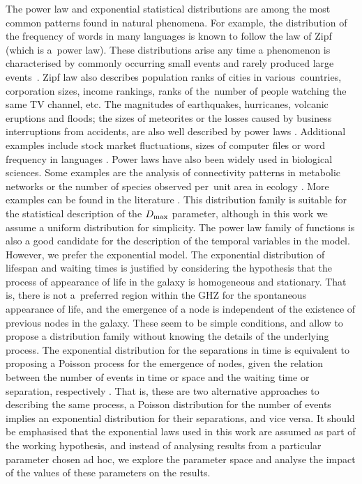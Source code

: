 \documentclass[crop]{CSLB}
\begin{document}
The power law and exponential statistical distributions are among the
most common patterns found in natural phenomena.
%
For example, the distribution of the frequency of words in many
languages is known to follow the law of Zipf (which is a power law).
%
These distributions arise any time a phenomenon is characterised by
commonly occurring small events and rarely produced large
events \citep[e.g.  ][]{adamic_zipf_2000}.
%
Zipf law also describes population ranks of cities in
various countries, corporation sizes, income rankings, ranks of
the number of people watching the same TV channel, etc.
%
The magnitudes of earthquakes, hurricanes, volcanic eruptions and
floods; the sizes of meteorites or the losses caused by business
interruptions from accidents, are also well described by power laws
\citep{sornette_critical_2006}.
%
Additional examples include stock market fluctuations, sizes of
computer files or word frequency in languages
\citep{mitzenmacher_brief_2004, newman_power_2005,
simkin_theory_2006}. 
%
Power laws have also been widely used in biological sciences.
%
Some examples are the analysis of connectivity patterns in metabolic
networks \citep{jeong_large_2000} or the number of species observed
per unit area in ecology \citep{martin_origin_2006,
frank_common_2009}.
%
More examples can be found in the literature
\citep{martin_origin_2006, maccone_KLT_2010, barabasi_scale_2009,
maccone_evolution_2014, maccone_lognormals_2014}.
%
This distribution family is suitable for the statistical description
of the $D_{\rm max}$ parameter, although in this work we assume a
uniform distribution for simplicity.
%
The power law family of functions is also a good candidate for the
description of the temporal variables in the model.
%
However, we prefer the exponential model.
%
The exponential distribution of lifespan and waiting times is
justified by considering the hypothesis that the process of appearance
of life in the galaxy is homogeneous and stationary.
%
That is, there is not a preferred region within the GHZ for the
spontaneous appearance of life, and the emergence of a node is
independent of the existence of previous nodes in the galaxy.
%
These seem to be simple conditions, and allow to propose a
distribution family without knowing the details of the underlying
process.
%
The exponential distribution for the separations in time is equivalent
to proposing a Poisson process for the emergence of nodes, given the
relation between the number of events in time or space and the waiting
time or separation, respectively \citep[e.g.,
][]{ross_simulation_2012}.
%
That is, these are two alternative approaches to describing the same
process, a Poisson distribution for the number of events implies an
exponential distribution for their separations, and vice versa.
%
It should be emphasised that the exponential laws used in this work
are assumed as part of the working hypothesis, and instead of
analysing results from a particular parameter chosen ad hoc, we
explore the parameter space and analyse the impact of the values of
these parameters on the results.
\end{document}
